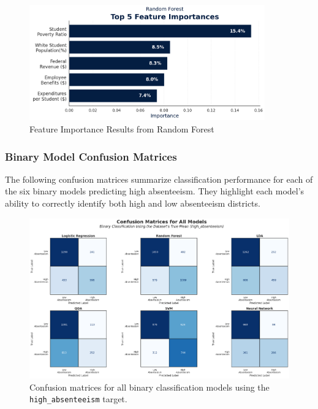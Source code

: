 \documentclass[
  11pt,
]{article}
\begin{document}
\begin{figure}[H]

{\centering \includegraphics[width=4in,height=\textheight]{../images/feature-importance.png}

}

\caption{Feature Importance Results from Random Forest}

\end{figure}%

\subsubsection{Binary Model Confusion
Matrices}\label{binary-model-confusion-matrices}

The following confusion matrices summarize classification performance
for each of the six binary models predicting high absenteeism. They
highlight each model's ability to correctly identify both high and low
absenteeism districts.

\begin{figure}[H]

{\centering \includegraphics{../images/all-models-conf-mat.png}

}

\caption{Confusion matrices for all binary classification models using
the \texttt{high\_absenteeism} target.}

\end{figure}%
\end{document}
